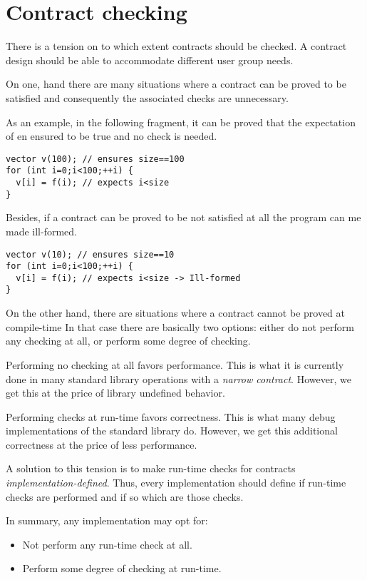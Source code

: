 \section{Contract checking}

There is a tension on to which extent contracts should be checked. A contract
design should be able to accommodate different user group needs.

On one, hand there are many situations where a contract can be proved to be 
satisfied and consequently the associated checks are unnecessary.

As an example, in the following fragment, it can be proved that the expectation
of  en ensured to be true and no check is needed.

\begin{lstlisting}
vector v(100); // ensures size==100
for (int i=0;i<100;++i) {
  v[i] = f(i); // expects i<size
}
\end{lstlisting}

Besides, if a contract can be proved to be not satisfied at all the program
can me made ill-formed.

\begin{lstlisting}
vector v(10); // ensures size==10
for (int i=0;i<100;++i) {
  v[i] = f(i); // expects i<size -> Ill-formed
}
\end{lstlisting}

On the other hand, there are situations where a contract cannot be proved at
compile-time In that case there are basically two options: either do not
perform any checking at all, or perform some degree of checking.

Performing no checking at all favors performance. This is what it is currently
done in many standard library operations with a \emph{narrow contract}. However,
we get this at the price of library undefined behavior.

Performing checks at run-time favors correctness. This is what many debug
implementations of the standard library do.  However, we get this additional
correctness at the price of less performance.

A solution to this tension is to make run-time checks for contracts 
\emph{implementation-defined}. Thus, every implementation should define if
run-time checks are performed and if so which are those checks.

In summary, any implementation may opt for:

\begin{itemize}

\item Not perform any run-time check at all.

\item Perform some degree of checking at run-time.

\end{itemize}


